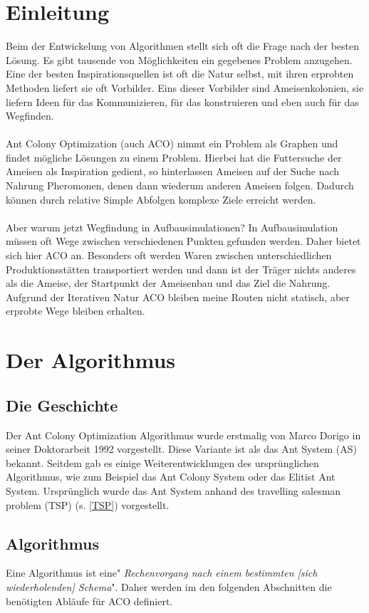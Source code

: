 \documentclass[12pt]{article}
\begin{document}
\tableofcontents
\pagebreak

\section{Einleitung} \label{Einleitung}
Beim der Entwickelung von Algorithmen stellt sich oft die Frage nach der besten Lösung. Es gibt tausende von Möglichkeiten ein gegebenes Problem anzugehen. Eine der besten Inspirationsquellen ist oft die Natur selbst, mit ihren erprobten Methoden liefert sie oft Vorbilder. Eins dieser Vorbilder sind Ameisenkolonien, sie liefern Ideen für das Kommunizieren, für das konstruieren und eben auch für das Wegfinden.\\\\
Ant Colony Optimization (auch ACO) nimmt ein Problem als Graphen und findet mögliche Lösungen zu einem Problem. Hierbei hat die Futtersuche der Ameisen als Inspiration gedient, so hinterlassen Ameisen auf der Suche nach Nahrung Pheromonen, denen dann wiederum anderen Ameisen folgen. Dadurch können durch relative Simple Abfolgen komplexe Ziele erreicht werden.\\\\
Aber warum jetzt Wegfindung in Aufbausimulationen? In Aufbausimulation müssen oft Wege zwischen verschiedenen Punkten gefunden werden. Daher bietet sich hier ACO an. Besonders oft werden Waren zwischen unterschiedlichen Produktionsstätten transportiert werden und dann ist der Träger nichts anderes als die Ameise, der Startpunkt der Ameisenbau und das Ziel die Nahrung. Aufgrund der Iterativen Natur ACO bleiben meine Routen nicht statisch, aber erprobte Wege bleiben erhalten.
\section{Der Algorithmus}
\subsection{Die Geschichte}\label{Geschichte}
Der Ant Colony Optimization Algorithmus wurde erstmalig von Marco Dorigo in seiner Doktorarbeit 1992 vorgestellt. Diese Variante ist als das Ant System (AS) bekannt. Seitdem gab es einige Weiterentwicklungen des ursprünglichen Algorithmus, wie zum Beispiel das Ant Colony System oder das Elitist Ant System.
Ursprünglich wurde das Ant System anhand des travelling salesman problem (TSP) (s. \ref{TSP}) vorgestellt.
\subsection{Algorithmus}
Eine Algorithmus ist eine"\textit{ Rechenvorgang nach einem bestimmten [sich wiederholenden] Schema}"\cite{duden_algo}. Daher werden im den folgenden Abschnitten die benötigten Abläufe für ACO definiert.
\end{document}
